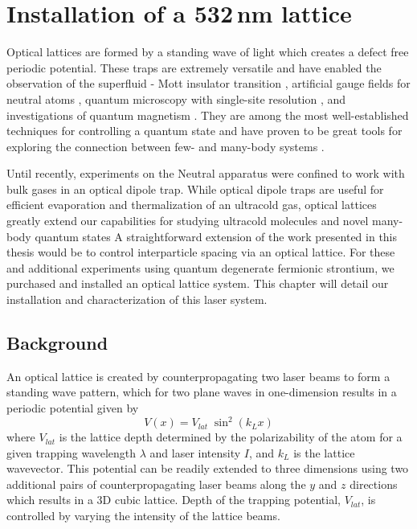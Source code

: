 \chapter{Installation of a 532\,nm lattice} \label{ch:chap6}
	
Optical lattices are formed by a standing wave of light which creates a defect free periodic potential.
These traps are extremely versatile and have enabled the observation of the superfluid - Mott insulator transition \cite{Greiner2002}, artificial gauge fields for neutral atoms \cite{Lin2011a}, quantum microscopy with single-site resolution \cite{Bakr2009}, and investigations of quantum magnetism \cite{Hart2015,Greif2015}. 
They are among the most well-established techniques for controlling a quantum state and have proven to be great tools for exploring the connection between few- and many-body systems \cite{bdz08}.

Until recently, experiments on the Neutral apparatus were confined to work with bulk gases in an optical dipole trap.
While optical dipole traps are useful for efficient evaporation and thermalization of an ultracold gas, optical lattices greatly extend our capabilities for studying ultracold molecules and novel many-body quantum states \cite{mtj00,Thalhammer2006,mob06,lsb08,Cappellini2014,zbb14}
A straightforward extension of the work presented in this thesis would be to control interparticle spacing via an optical lattice. 
For these and additional experiments using quantum degenerate fermionic strontium, we purchased and installed an optical lattice system. 
This chapter will detail our installation and characterization of this laser system.

\section{Background} \label{sec:latBackground}
An optical lattice is created by counterpropagating two laser beams to form a standing wave pattern, which for two plane waves in one-dimension results in a periodic potential given by 
	\begin{equation} \label{eq:1dlattice}
		 V(x) = V_{lat} \; \sin^2(k_L x)
	\end{equation}
where $V_{lat}$ is the lattice depth determined by the polarizability of the atom for a given trapping wavelength $\lambda$ and laser intensity $I$, and $k_L$ is the lattice wavevector.
This potential can be readily extended to three dimensions using two additional pairs of counterpropagating laser beams along the $y$ and $z$ directions which results in a 3D cubic lattice.
Depth of the trapping potential, $V_{lat}$, is controlled by varying the intensity of the lattice beams.

